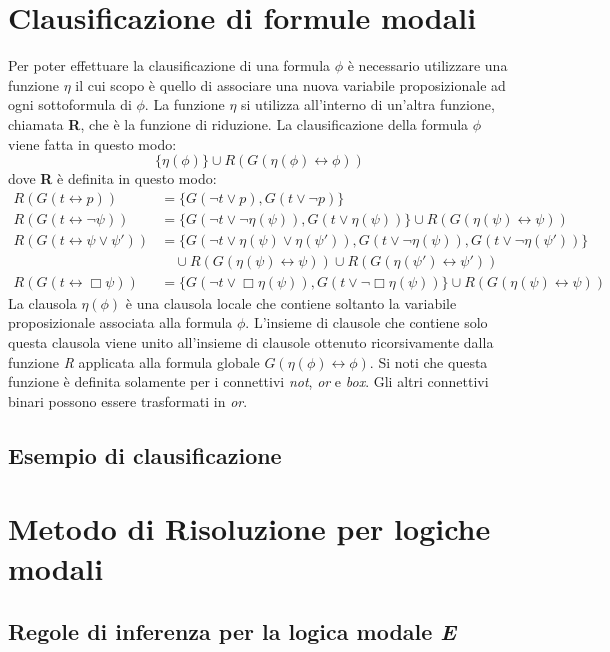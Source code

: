 \documentclass[a4paper,12pt]{report}
\newcommand{\tto} {\leftrightarrow}
\begin{document}
\section{Clausificazione di formule modali}
Per poter effettuare la clausificazione di una formula $\phi$ è necessario utilizzare una funzione $\eta$ il cui scopo è quello di associare una nuova variabile proposizionale ad ogni sottoformula di $\phi$. La funzione $\eta$ si utilizza all'interno di un'altra funzione, chiamata \textbf{R}, che è la funzione di riduzione. La clausificazione della formula $\phi$ viene fatta in questo modo:
\[ \{ \eta(\phi) \} \cup R(G(\eta(\phi) \tto \phi)) \]
dove \textbf{R} è definita in questo modo:
\[
\begin{aligned}
R(G(t \tto p)) &= \{ G(\lnot t \lor p), G(t \lor \lnot p) \} \\
R(G(t \tto \lnot \psi)) &= \{ G(\lnot t \lor \lnot \eta(\psi)), G(t \lor \eta(\psi)) \} \cup R(G(\eta(\psi) \tto \psi)) \\
R(G(t \tto \psi \lor \psi')) &= \{ G(\lnot t \lor \eta(\psi) \lor \eta(\psi')), G(t \lor \lnot \eta(\psi)), G(t \lor \lnot \eta(\psi')) \} \\
& \quad \cup R(G(\eta(\psi) \tto \psi)) \cup R(G(\eta(\psi') \tto \psi')) \\
R(G(t \tto \Box \psi)) &= \{ G(\lnot t \lor \Box \eta(\psi)), G(t \lor \lnot \Box \eta(\psi)) \} \cup R(G(\eta(\psi) \tto \psi))
\end{aligned}
\]
La clausola {$\eta(\phi)$} è una clausola locale che contiene soltanto la variabile proposizionale associata alla formula $\phi$.      L'insieme di clausole che contiene solo questa clausola viene unito all'insieme di clausole ottenuto ricorsivamente dalla funzione \emph{R} applicata alla formula globale $G(\eta(\phi) \tto \phi)$. Si noti che questa funzione è definita solamente per i connettivi \emph{not}, \emph{or} e \emph{box}. Gli altri connettivi binari possono essere trasformati in \emph{or}.

\subsection{Esempio di clausificazione}

\section{Metodo di Risoluzione per logiche modali}
\subsection{Regole di inferenza per la logica modale \emph{E}}
\end{document}
